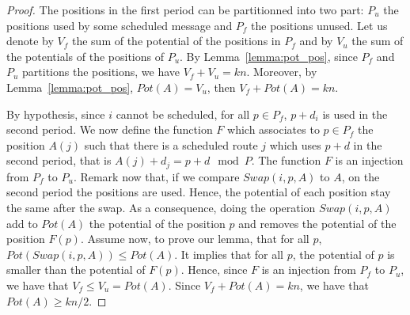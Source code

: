 \documentclass[10pt, conference, letterpaper]{IEEEtran}
\begin{document}
\begin{proof}\label{swap}
The positions in the first period can be partitionned into two part: $P_{u}$ the positions used by some scheduled message and $P_{f}$ the positions unused.
Let us denote by $V_f$ the sum of the potential of the positions in $P_f$ and by $V_u$ the sum of the potentials of the positions of $P_u$. By Lemma~\ref{lemma:pot_pos}, since $P_f$ and $P_u$ partitions the positions, we have $V_f + V_u = kn$. Moreover, by Lemma~\ref{lemma:pot_pos}, $Pot(A) = V_u$, then $V_f + Pot(A) = kn$.

By hypothesis, since $i$ cannot be scheduled, for all $p \in P_{f}$, $p+d_i$ is used in the second period. We now define the function $F$ which associates to $p \in P_{f}$ the position $A(j)$ such that there is a scheduled route $j$ which uses $p+d$ in the second period, that is $A(j) + d_j = p + d \mod P$. The function $F$ is an injection from $P_{f}$ to $P_u$. Remark now that, if we compare $Swap(i,p,A)$ to $A$, on the second period the positions are used. Hence, the potential of each position stay the same after the swap. As a consequence, doing the operation $Swap(i,p,A)$ add to $Pot(A)$ the potential of the position $p$ and removes the potential of the position $F(p)$. 
Assume now, to prove our lemma, that for all $p$, $Pot(Swap(i,p,A)) \leq Pot(A)$. It implies that for all $p$, the potential of $p$ is smaller than the potential of $F(p)$. Hence,
since $F$ is an injection from $P_f$ to $P_u$, we have that $V_f \leq V_u = Pot(A)$.
Since $V_f + Pot(A) = kn$, we have that $Pot(A) \geq kn/2$.
\end{proof}
\end{document}
